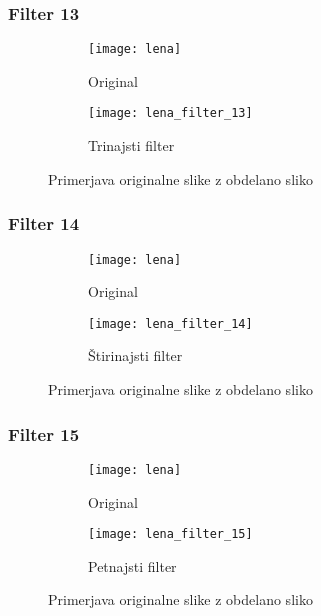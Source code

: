 \subsubsection*{Filter 13}
\begin{figure}[h]
    \centering
    \begin{subfigure}[b]{0.4\textwidth}
        \texttt{[image: lena]}
        \caption{Original}
    \end{subfigure}
    \begin{subfigure}[b]{0.4\textwidth}
        \texttt{[image: lena\_filter\_13]}
        \caption{Trinajsti filter}
    \end{subfigure}
    \caption{Primerjava originalne slike z obdelano sliko}
    \label{fig:lena_filter_13}
\end{figure}


\subsubsection*{Filter 14}
\begin{figure}[h]
    \centering
    \begin{subfigure}[b]{0.4\textwidth}
        \texttt{[image: lena]}
        \caption{Original}
    \end{subfigure}
    \begin{subfigure}[b]{0.4\textwidth}
        \texttt{[image: lena\_filter\_14]}
        \caption{Štirinajsti filter}
    \end{subfigure}
    \caption{Primerjava originalne slike z obdelano sliko}
    \label{fig:lena_filter_14}
\end{figure}


\subsubsection*{Filter 15}
\begin{figure}[h]
    \centering
    \begin{subfigure}[b]{0.4\textwidth}
        \texttt{[image: lena]}
        \caption{Original}
    \end{subfigure}
    \begin{subfigure}[b]{0.4\textwidth}
        \texttt{[image: lena\_filter\_15]}
        \caption{Petnajsti filter}
    \end{subfigure}
    \caption{Primerjava originalne slike z obdelano sliko}
    \label{fig:lena_filter_15}
\end{figure}



